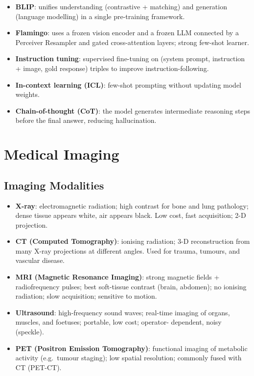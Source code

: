 \documentclass[12pt,a4paper]{report}
\begin{document}
\begin{itemize}[itemsep=2pt]
    \item \textbf{BLIP}: unifies understanding (contrastive + matching) and
          generation (language modelling) in a single pre-training framework.
    \item \textbf{Flamingo}: uses a frozen vision encoder and a frozen LLM
          connected by a Perceiver Resampler and gated cross-attention layers;
          strong few-shot learner.
    \item \textbf{Instruction tuning}: supervised fine-tuning on
          (system prompt, instruction + image, gold response) triples to
          improve instruction-following.
    \item \textbf{In-context learning (ICL)}: few-shot prompting without
          updating model weights.
    \item \textbf{Chain-of-thought (CoT)}: the model generates intermediate
          reasoning steps before the final answer, reducing hallucination.
\end{itemize}

\chapter{Medical Imaging}

\section{Imaging Modalities}

\begin{itemize}[itemsep=2pt]
    \item \textbf{X-ray}: electromagnetic radiation; high contrast for bone
          and lung pathology; dense tissue appears white, air appears black.
          Low cost, fast acquisition; 2-D projection.
    \item \textbf{CT (Computed Tomography)}: ionising radiation;
          3-D reconstruction from many X-ray projections at different angles.
          Used for trauma, tumours, and vascular disease.
    \item \textbf{MRI (Magnetic Resonance Imaging)}: strong magnetic fields
          + radiofrequency pulses; best soft-tissue contrast (brain, abdomen);
          no ionising radiation; slow acquisition; sensitive to motion.
    \item \textbf{Ultrasound}: high-frequency sound waves; real-time imaging
          of organs, muscles, and foetuses; portable, low cost; operator-
          dependent, noisy (speckle).
    \item \textbf{PET (Positron Emission Tomography)}: functional imaging of
          metabolic activity (e.g.\ tumour staging); low spatial resolution;
          commonly fused with CT (PET-CT).
\end{itemize}
\end{document}
